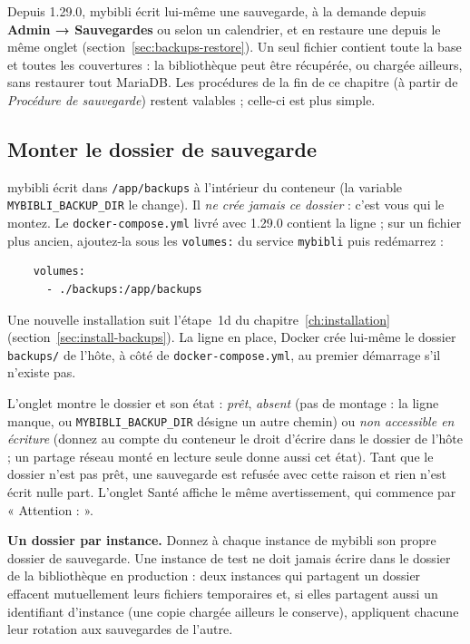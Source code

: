 Depuis 1.29.0, mybibli écrit lui-même une sauvegarde, à la demande
depuis \textbf{Admin → Sauvegardes}
ou selon un calendrier, et en restaure une depuis le même onglet
(section~\ref{sec:backups-restore}). Un seul fichier contient toute la
base et toutes les couvertures : la bibliothèque peut être récupérée,
ou chargée ailleurs, sans restaurer tout MariaDB. Les procédures de la
fin de ce chapitre (à partir de \emph{Procédure de sauvegarde}) restent
valables ; celle-ci est plus simple.

\subsection*{Monter le dossier de sauvegarde}

mybibli écrit dans \texttt{/app/backups} à l'intérieur du conteneur
(la variable \texttt{MYBIBLI\_BACKUP\_DIR} le change). Il \emph{ne crée
jamais ce dossier} : c'est vous qui le montez. Le
\texttt{docker-compose.yml} livré avec 1.29.0 contient la ligne ; sur
un fichier plus ancien, ajoutez-la sous les \texttt{volumes:} du
service \texttt{mybibli} puis redémarrez :

\begin{lstlisting}
    volumes:
      - ./backups:/app/backups
\end{lstlisting}

Une nouvelle installation suit l'étape~1d du
chapitre~\ref{ch:installation} (section~\ref{sec:install-backups}). La
ligne en place, Docker crée lui-même le dossier \texttt{backups/} de
l'hôte, à côté de \texttt{docker-compose.yml}, au premier démarrage
s'il n'existe pas.

L'onglet montre le dossier et son état : \emph{prêt}, \emph{absent}
(pas de montage : la ligne manque, ou \texttt{MYBIBLI\_BACKUP\_DIR}
désigne un autre chemin) ou \emph{non accessible en écriture} (donnez
au compte du conteneur le droit d'écrire dans le dossier de l'hôte ; un
partage réseau monté en lecture seule donne aussi cet état). Tant que
le dossier n'est pas prêt, une sauvegarde est refusée avec cette raison
et rien n'est écrit nulle part. L'onglet Santé affiche le même
avertissement, qui commence par « Attention : ».

\textbf{Un dossier par instance.} Donnez à chaque instance de mybibli
son propre dossier de sauvegarde. Une instance de test ne doit jamais
écrire dans le dossier de la bibliothèque en production : deux
instances qui partagent un dossier effacent mutuellement leurs fichiers
temporaires et, si elles partagent aussi un identifiant d'instance (une
copie chargée ailleurs le conserve), appliquent chacune leur rotation
aux sauvegardes de l'autre.

